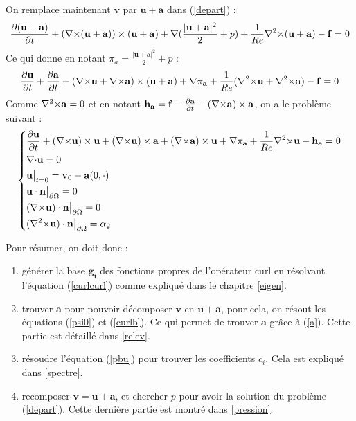 On remplace maintenant $\mathbf{v}$ par $\mathbf{u}+\mathbf{a}$ dans (\ref{depart}) :
\[
\frac{\partial(\mathbf{u}+\mathbf{a})}{\partial t}+({\nabla\times}(\mathbf{u}+\mathbf{a}))\times(\mathbf{u}+\mathbf{a}) + {\nabla} (\frac{|\mathbf{u}+\mathbf{a}|^2}{2}+p) + \frac{1}{Re}{\nabla^2\times}(\mathbf{u}+\mathbf{a}) - \mathbf{f} = 0
\]
Ce qui donne en notant $\pi_a=\frac{|\mathbf{u}+\mathbf{a}|^2}{2}+p$ :
\[
\frac{\partial \mathbf{u}}{\partial t}+\frac{\partial \mathbf{a}}{\partial t} + ({\nabla\times} \mathbf{u}+{\nabla\times} \mathbf{a})\times(\mathbf{u}+\mathbf{a}) + {\nabla}\pi_{\mathbf{a}} + \frac{1}{Re}({\nabla^2\times} \mathbf{u}+{\nabla^2\times} \mathbf{a}) - \mathbf{f} = 0
\]
Comme ${\nabla^2\times} \mathbf{a} = 0$ et en notant $\mathbf{h_a}=\mathbf{f}-\frac{\partial \mathbf{a}}{\partial t} - ({\nabla\times} \mathbf{a})\times \mathbf{a}$, on a le problème suivant :
\begin{equation}
\label{pbu}
\left\{
\begin{aligned}
&\frac{\partial \mathbf{u}}{\partial t} + ({\nabla\times} \mathbf{u})\times \mathbf{u} + ({\nabla\times} \mathbf{u})\times \mathbf{a} +({\nabla\times} \mathbf{a})\times \mathbf{u} + {\nabla} \pi_{\mathbf{a}} +\frac{1}{Re}{\nabla^2\times}  \mathbf{u} - \mathbf{h_a} = 0\\
&{\nabla\cdot} \mathbf{u} = 0\\
&\mathbf{u}\big\rvert_{t=0} = \mathbf{v}_0 - \mathbf{a}(0,\cdot)\\
&\mathbf{u}\cdot \mathbf{n}{\big\rvert_{\partial\Omega}} = 0\\
&({\nabla\times} \mathbf{u})\cdot \mathbf{n}{\big\rvert_{\partial\Omega}} = 0\\
&({\nabla^2\times}  \mathbf{u})\cdot \mathbf{n}{\big\rvert_{\partial\Omega}} = \alpha_2
\end{aligned}
\right.
\end{equation}

Pour résumer, on doit donc :
\begin{enumerate}
\item générer la base $\mathbf{g_i}$ des fonctions propres de l'opérateur curl en résolvant l'équation (\ref{curlcurl}) comme expliqué dans le chapitre \ref{eigen}.
\item trouver $\mathbf{a}$ pour pouvoir décomposer $\mathbf{v}$ en $\mathbf{u}+\mathbf{a}$, pour cela, on résout les équations (\ref{psi0}) et (\ref{curlb}). Ce qui permet de trouver $\mathbf{a}$ grâce à (\ref{a}). Cette partie est détaillé dans \ref{relev}.
\item résoudre l'équation (\ref{pbu}) pour trouver les coefficients $c_i$. Cela est expliqué dans \ref{spectre}.
\item recomposer $\mathbf{v}=\mathbf{u}+\mathbf{a}$, et chercher $p$ pour avoir la solution du problème (\ref{depart}). Cette dernière partie est montré dans \ref{pression}.
\end{enumerate}

